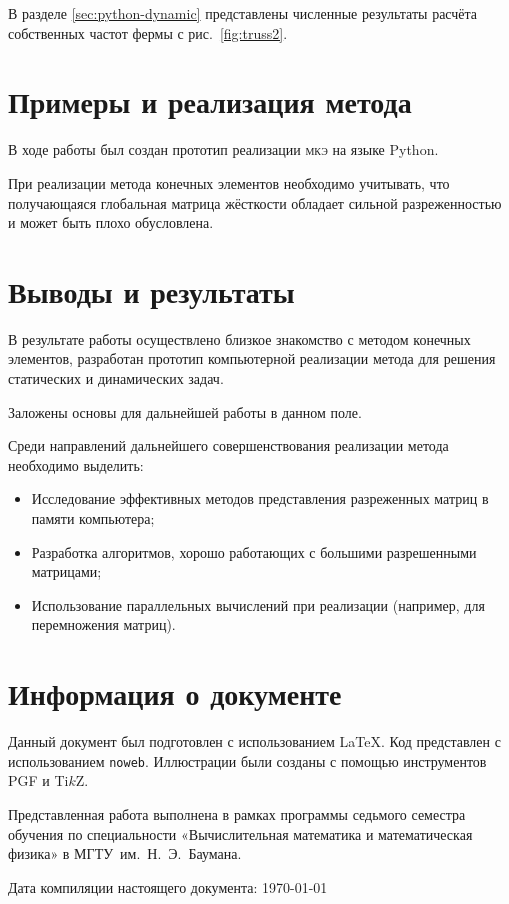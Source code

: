 \documentclass[10pt]{article}
\numberwithin{equation}{section}
\newcommand{\program}[1]{{\tt #1}}
\newcommand{\fem}{\textsc{мкэ}}
\newcommand{\figref}[1]{рис. \ref{#1}}
\begin{document}
В разделе \ref{sec:python-dynamic} представлены численные результаты
расчёта собственных частот фермы с \figref{fig:truss2}.

\section{Примеры и реализация метода}
\label{sec:python}

В ходе работы был создан прототип реализации \fem{} на языке Python.

При реализации метода конечных элементов необходимо учитывать, что
получающаяся глобальная матрица жёсткости обладает сильной
разреженностью и может быть плохо обусловлена.



\section{Выводы и результаты}

В результате работы осуществлено близкое знакомство с методом конечных
элементов, разработан прототип компьютерной реализации метода для
решения статических и динамических задач.

Заложены основы для дальнейшей работы в данном поле.

Среди направлений дальнейшего совершенствования реализации метода
необходимо выделить:
\begin{itemize}
\item Исследование эффективных методов представления разреженных
  матриц в памяти компьютера;

\item Разработка алгоритмов, хорошо работающих с большими разрешенными
  матрицами;

\item Использование параллельных вычислений при реализации (например,
  для перемножения матриц).
\end{itemize}

\clearpage
\appendix
\section{Информация о документе}

Данный документ был подготовлен с использованием \LaTeX{}. Код
представлен с использованием \program{noweb}. Иллюстрации были созданы
с помощью инструментов PGF и Ti$k$Z.

Представленная работа выполнена в рамках программы седьмого семестра
обучения по специальности «Вычислительная математика и математическая
физика» в МГТУ им. Н. Э. Баумана.

Дата компиляции настоящего документа: \today



\end{document}
